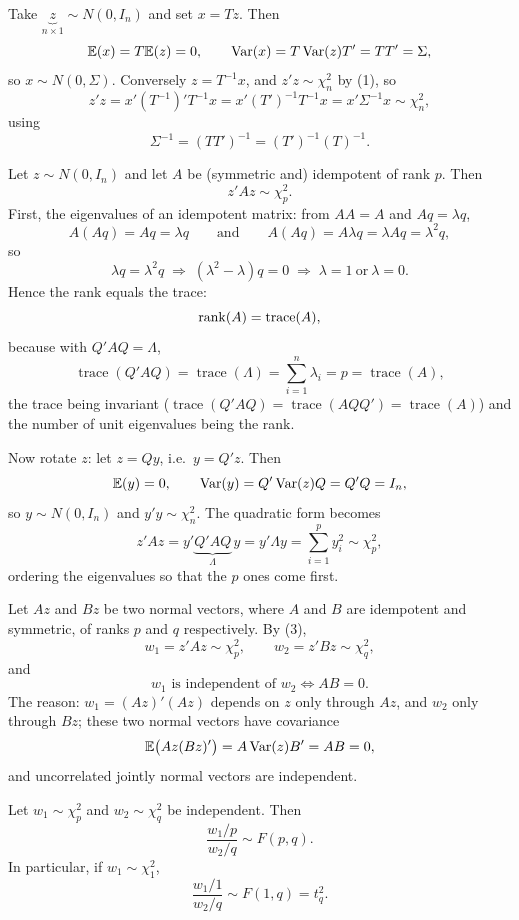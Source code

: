 \documentclass[11pt]{article}
\begin{document}
Take $\underbrace{z}_{n\times1} \sim N(0, I_{n})$ and set $x = Tz$. Then
\[ \mathbb{E}(x) = T\mathbb{E}(z) = 0, \qquad
   \operatorname{Var}(x) = T\operatorname{Var}(z)T' = TT' = \Sigma, \]
so $x \sim N(0, \Sigma)$. Conversely $z = T^{-1}x$, and $z'z \sim \chi^{2}_{n}$ by (1),
so
\[ z'z = x'(T^{-1})'T^{-1}x = x'(T')^{-1}T^{-1}x = x'\Sigma^{-1}x \sim \chi^{2}_{n}, \]
using
\[ \Sigma^{-1} = (TT')^{-1} = (T')^{-1}(T)^{-1}. \]

Let $z \sim N(0, I_{n})$ and let $A$ be (symmetric and) idempotent of rank $p$. Then
\[ z'Az \sim \chi^{2}_{p}. \]
First, the eigenvalues of an idempotent matrix: from $AA = A$ and $Aq = \lambda q$,
\[ A(Aq) = Aq = \lambda q \qquad\text{and}\qquad A(Aq) = A\lambda q = \lambda Aq = \lambda^{2}q, \]
so
\[ \lambda q = \lambda^{2}q \;\Longrightarrow\; (\lambda^{2} - \lambda)q = 0
   \;\Longrightarrow\; \lambda = 1 \ \text{or}\ \lambda = 0. \]
Hence the rank equals the trace:
\[ \operatorname{rank}(A) = \operatorname{trace}(A), \]
because with $Q'AQ = \Lambda$,
\[ \operatorname{trace}(Q'AQ) = \operatorname{trace}(\Lambda) = \sum_{i=1}^{n}\lambda_{i} = p
   = \operatorname{trace}(A), \]
the trace being invariant ($\operatorname{trace}(Q'AQ) = \operatorname{trace}(AQQ') = \operatorname{trace}(A)$)
and the number of unit eigenvalues being the rank.

Now rotate $z$: let $z = Qy$, i.e.\ $y = Q'z$. Then
\[ \mathbb{E}(y) = 0, \qquad \operatorname{Var}(y) = Q'\operatorname{Var}(z)Q = Q'Q = I_{n}, \]
so $y \sim N(0, I_{n})$ and $y'y \sim \chi^{2}_{n}$. The quadratic form becomes
\[ z'Az = y'\underbrace{Q'AQ}_{\Lambda}\,y = y'\Lambda y
   = \sum_{i=1}^{p} y_{i}^{2} \sim \chi^{2}_{p}, \]
ordering the eigenvalues so that the $p$ ones come first.

Let $Az$ and $Bz$ be two normal vectors, where $A$ and $B$ are idempotent and
symmetric, of ranks $p$ and $q$ respectively. By (3),
\[ w_{1} = z'Az \sim \chi^{2}_{p}, \qquad w_{2} = z'Bz \sim \chi^{2}_{q}, \]
and
\[ w_{1} \text{ is independent of } w_{2} \iff AB = 0. \]
The reason: $w_{1} = (Az)'(Az)$ depends on $z$ only through $Az$, and $w_{2}$ only
through $Bz$; these two normal vectors have covariance
\[ \mathbb{E}\bigl(Az(Bz)'\bigr) = A\operatorname{Var}(z)B' = AB = 0, \]
and uncorrelated jointly normal vectors are independent.

Let $w_{1} \sim \chi^{2}_{p}$ and $w_{2} \sim \chi^{2}_{q}$ be independent. Then
\[ \frac{w_{1}/p}{w_{2}/q} \sim F(p, q). \]
In particular, if $w_{1} \sim \chi^{2}_{1}$,
\[ \frac{w_{1}/1}{w_{2}/q} \sim F(1, q) = t_{q}^{2}. \]
\end{document}
